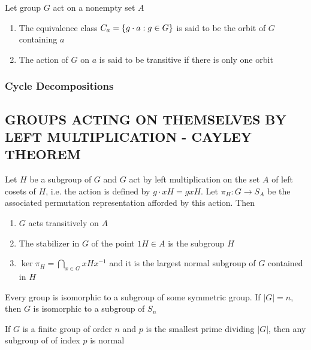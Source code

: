 \begin{definition}[Orbit]
	Let group $G$ act on a nonempty set $A$
	\begin{enumerate}
		\item The equivalence class $C_a = \{g \cdot a: g \in G\}$ is said to be the orbit of $G$ containing $a$
		\item The action of $G$ on $a$ is said to be transitive if there is only one orbit
	\end{enumerate}
\end{definition}

\subsubsection{Cycle Decompositions}

\subsection{GROUPS ACTING ON THEMSELVES BY LEFT MULTIPLICATION - CAYLEY THEOREM}

\begin{theorem}
	Let $H$ be a subgroup of $G$ and $G$ act by left multiplication on the set $A$ of left cosets of $H$, i.e. the action is defined by $g \cdot xH = gxH$. Let $\pi_H: G \to S_A$ be the associated permutation representation afforded by this action. Then
	\begin{enumerate}
		\item $G$ acts transitively on $A$
		\item The stabilizer in $G$ of the point $1H \in A$ is the subgroup $H$
		\item $\ker \pi_H = \bigcap_{x \in G} xHx^{-1}$ and it is the largest normal subgroup of $G$ contained in $H$
	\end{enumerate}
\end{theorem}

\begin{corollary}
	Every group is isomorphic to a subgroup of some symmetric group. If $|G| = n$, then $G$ is isomorphic to a subgroup of $S_n$
	
\end{corollary}

\begin{corollary}
	If $G$ is a finite group of order $n$ and $p$ is the smallest prime dividing $|G|$, then any subgroup of of index $p$ is normal
\end{corollary}


